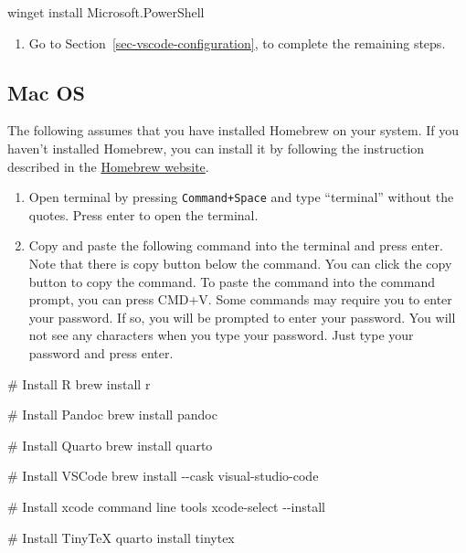 \documentclass[
  letterpaper,
  DIV=11,
  numbers=noendperiod]{scrartcl}
\newenvironment{Shaded}{\begin{snugshade}}{\end{snugshade}}
\newcommand{\AttributeTok}[1]{\textcolor[rgb]{0.40,0.45,0.13}{#1}}
\newcommand{\CommentTok}[1]{\textcolor[rgb]{0.37,0.37,0.37}{#1}}
\newcommand{\ExtensionTok}[1]{\textcolor[rgb]{0.00,0.23,0.31}{#1}}
\newcommand{\NormalTok}[1]{\textcolor[rgb]{0.00,0.23,0.31}{#1}}
\providecommand{\tightlist}{%
  \setlength{\itemsep}{0pt}\setlength{\parskip}{0pt}}\usepackage{longtable,booktabs,array}
\begin{document}
\begin{Shaded}
\begin{Highlighting}[]
\ExtensionTok{winget}\NormalTok{ install Microsoft.PowerShell}
\end{Highlighting}
\end{Shaded}

\begin{enumerate}
\def\labelenumi{\arabic{enumi}.}
\setcounter{enumi}{8}
\tightlist
\item
  Go to Section~\ref{sec-vscode-configuration}, to complete the
  remaining steps.
\end{enumerate}

\hypertarget{mac-os}{%
\subsection{Mac OS}\label{mac-os}}

The following assumes that you have installed Homebrew on your system.
If you haven't installed Homebrew, you can install it by following the
instruction described in the \href{https://brew.sh/}{Homebrew website}.

\begin{enumerate}
\def\labelenumi{\arabic{enumi}.}
\item
  Open terminal by pressing \texttt{Command+Space} and type ``terminal''
  without the quotes. Press enter to open the terminal.
\item
  Copy and paste the following command into the terminal and press
  enter. Note that there is copy button below the command. You can click
  the copy button to copy the command. To paste the command into the
  command prompt, you can press CMD+V. Some commands may require you to
  enter your password. If so, you will be prompted to enter your
  password. You will not see any characters when you type your password.
  Just type your password and press enter.
\end{enumerate}

\begin{Shaded}
\begin{Highlighting}[]
\CommentTok{\#  Install R}
\ExtensionTok{brew}\NormalTok{ install r}

\CommentTok{\# Install Pandoc}
\ExtensionTok{brew}\NormalTok{ install pandoc}

\CommentTok{\# Install Quarto}
\ExtensionTok{brew}\NormalTok{ install quarto}

\CommentTok{\# Install VSCode}
\ExtensionTok{brew}\NormalTok{ install }\AttributeTok{{-}{-}cask}\NormalTok{ visual{-}studio{-}code}

\CommentTok{\# Install xcode command line tools}
\ExtensionTok{xcode{-}select} \AttributeTok{{-}{-}install}

\CommentTok{\# Install TinyTeX}
\ExtensionTok{quarto}\NormalTok{ install tinytex}
\end{Highlighting}
\end{Shaded}
\end{document}
